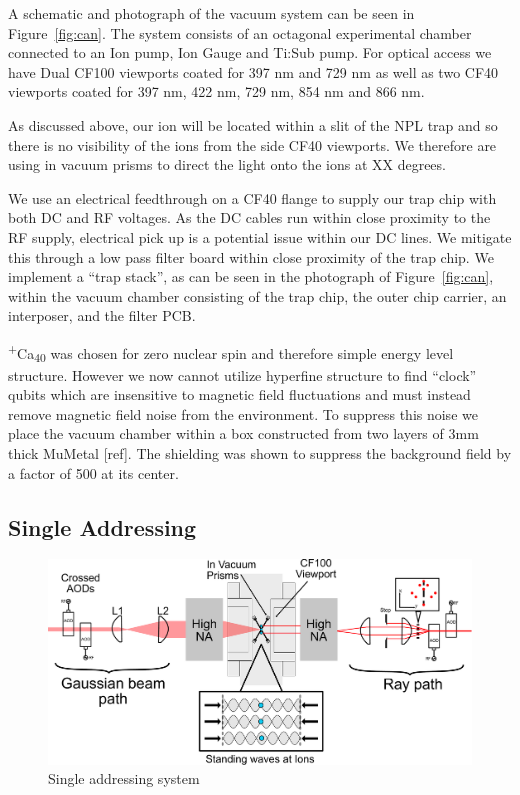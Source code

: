 \documentclass[12pt]{iopart}
\begin{document}
A schematic and photograph of the vacuum system can be seen in Figure~\ref{fig:can}. The system
consists of an octagonal experimental chamber connected to an Ion
pump, Ion Gauge and Ti:Sub pump. For optical access we have Dual CF100
viewports coated for 397 nm and 729 nm as well as two CF40 viewports
coated for 397 nm, 422 nm, 729 nm, 854 nm and 866 nm.

As discussed above, our ion will be located within a slit of the NPL
trap and so there is no visibility of the ions from the side CF40
viewports. We therefore are using in vacuum prisms to direct the light
onto the ions at XX degrees.

We use an electrical feedthrough on a CF40 flange to supply our trap
chip with both DC and RF voltages. As the DC cables run within close
proximity to the RF supply, electrical pick up is a potential issue
within our DC lines. We mitigate this through a low pass filter board
within close proximity of the trap chip. We implement a ``trap
stack'', as can be seen in the photograph of Figure~\ref{fig:can}, within the vacuum chamber consisting of the
trap chip, the outer chip carrier, an interposer, and the filter PCB.

\textsuperscript{+}Ca\textsubscript{40} was chosen for zero nuclear
spin and therefore simple energy level structure. However we now
cannot utilize hyperfine structure to find ``clock'' qubits which are
insensitive to magnetic field fluctuations and must instead remove
magnetic field noise from the environment. To suppress this noise 
we place the vacuum chamber within a box constructed from two layers
of 3mm thick MuMetal [ref]. The shielding was shown to suppress the
background field by a factor of 500 at its center.

\subsection{Single Addressing}

\begin{figure}
  \begin{center}
   \noindent\includegraphics[width=\linewidth]{figures/vac_can_AOD_small.pdf}
  \end{center}
  \caption{Single addressing system}
  \label{fig:AOD}
\end{figure}
\end{document}
